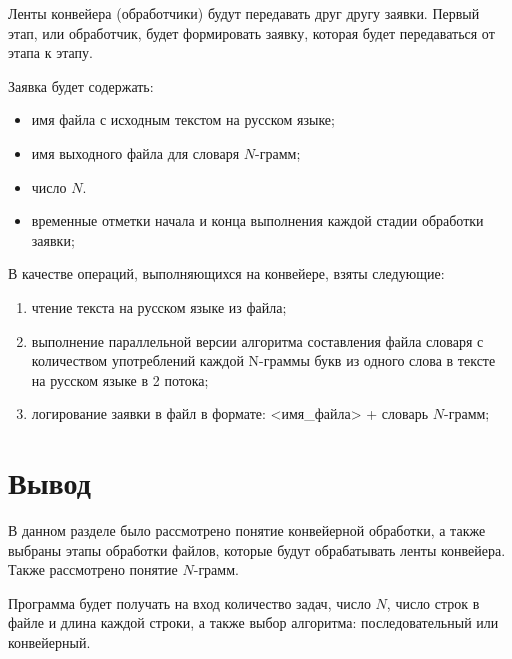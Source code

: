 Ленты конвейера (обработчики) будут передавать друг другу заявки. Первый этап, или обработчик, будет формировать заявку, которая будет передаваться от этапа к этапу.

Заявка будет содержать:

\begin{itemize}[label*=--]
	\item имя файла с исходным текстом на русском языке;
	\item имя выходного файла для словаря $N$-грамм;
	\item число $N$.
	\item временные отметки начала и конца выполнения каждой стадии обработки заявки;
\end{itemize}

В качестве операций, выполняющихся на конвейере, взяты следующие:

\begin{enumerate}[label={\arabic*)}]
	\item чтение текста на русском языке из файла;
	\item выполнение параллельной версии алгоритма составления файла словаря с количеством употреблений каждой N-граммы букв из одного слова в тексте на русском языке в 2 потока;
	\item логирование заявки в файл в формате: <имя\_файла> + словарь $N$-грамм;
\end{enumerate}

\section*{Вывод}

В данном разделе было рассмотрено понятие конвейерной обработки,
а также выбраны этапы обработки файлов, которые будут обрабатывать ленты конвейера. 
Также рассмотрено понятие $N$-грамм.

Программа будет получать на вход количество задач, число $N$, число строк в файле и длина каждой строки, а также выбор алгоритма: последовательный или конвейерный.
